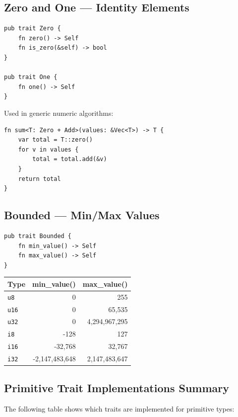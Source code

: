 \subsection{Zero and One --- Identity Elements}

\begin{lstlisting}
pub trait Zero {
    fn zero() -> Self
    fn is_zero(&self) -> bool
}

pub trait One {
    fn one() -> Self
}
\end{lstlisting}

Used in generic numeric algorithms:

\begin{lstlisting}
fn sum<T: Zero + Add>(values: &Vec<T>) -> T {
    var total = T::zero()
    for v in values {
        total = total.add(&v)
    }
    return total
}
\end{lstlisting}

\subsection{Bounded --- Min/Max Values}

\begin{lstlisting}
pub trait Bounded {
    fn min_value() -> Self
    fn max_value() -> Self
}
\end{lstlisting}

\begin{center}
\begin{tabular}{lrr}
\textbf{Type} & \textbf{min\_value()} & \textbf{max\_value()} \\
\hline
\texttt{u8} & 0 & 255 \\
\texttt{u16} & 0 & 65,535 \\
\texttt{u32} & 0 & 4,294,967,295 \\
\texttt{i8} & -128 & 127 \\
\texttt{i16} & -32,768 & 32,767 \\
\texttt{i32} & -2,147,483,648 & 2,147,483,647 \\
\end{tabular}
\end{center}

\subsection{Primitive Trait Implementations Summary}

The following table shows which traits are implemented for primitive types:

